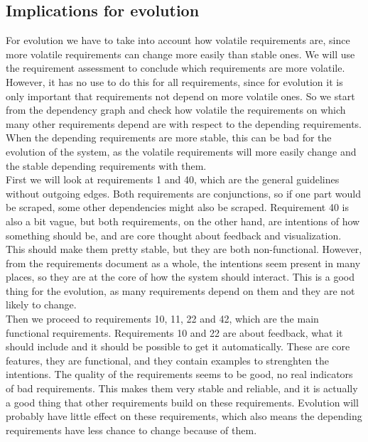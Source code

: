 \documentclass[a4paper,11pt]{article}
\begin{document}
		\subsection{Implications for evolution}
		For evolution we have to take into account how volatile requirements are, since more volatile requirements can change more easily than stable ones. We will use the requirement assessment to conclude which requirements are more volatile. However, it has no use to do this for all requirements, since for evolution it is only important that requirements not depend on more volatile ones. So we start from the dependency graph and check how volatile the requirements on which many other requirements depend are with respect to the depending requirements. When the depending requirements are more stable, this can be bad for the evolution of the system, as the volatile requirements will more easily change and the stable depending requirements with them. \\
		First we will look at requirements 1 and 40, which are the general guidelines without outgoing edges. Both requirements are conjunctions, so if one part would be scraped, some other dependencies might also be scraped. Requirement 40 is also a bit vague, but both requirements, on the other hand, are intentions of how something should be, and are core thought about feedback and visualization. This should make them pretty stable, but they are both non-functional. However, from the requirements document as a whole, the intentions seem present in many places, so they are at the core of how the system should interact. This is a good thing for the evolution, as many requirements depend on them and they are not likely to change. \\
		Then we proceed to requirements 10, 11, 22 and 42, which are the main functional requirements. Requirements 10 and 22 are about feedback, what it should include and it should be possible to get it automatically. These are core features, they are functional, and they contain examples to strenghten the intentions. The quality of the requirements seems to be good, no real indicators of bad requirements. This makes them very stable and reliable, and it is actually a good thing that other requirements build on these requirements. Evolution will probably have little effect on these requirements, which also means the depending requirements have less chance to change because of them. \\
\end{document}
